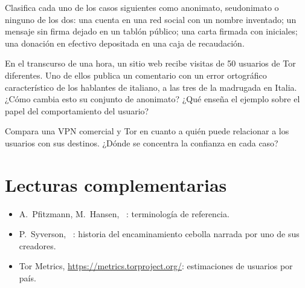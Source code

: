 \begin{esercizio}[1]\label{es:01-termini}
Clasifica cada uno de los casos siguientes como anonimato, seudonimato o ninguno de los dos: una cuenta en una red social con un nombre inventado; un mensaje sin firma dejado en un tablón público; una carta firmada con iniciales; una donación en efectivo depositada en una caja de recaudación.
\end{esercizio}

\begin{esercizio}[2]\label{es:01-insieme}
En el transcurso de una hora, un sitio web recibe visitas de 50 usuarios de Tor diferentes. Uno de ellos publica un comentario con un error ortográfico característico de los hablantes de italiano, a las tres de la madrugada en Italia. ¿Cómo cambia esto su conjunto de anonimato? ¿Qué enseña el ejemplo sobre el papel del comportamiento del usuario?
\end{esercizio}

\begin{esercizio}[2]\label{es:01-vpn}
Compara una VPN comercial y Tor en cuanto a quién puede relacionar a los usuarios con sus destinos. ¿Dónde se concentra la confianza en cada caso?
\end{esercizio}

\section*{Lecturas complementarias}
\begin{itemize}
  \item A.~Pfitzmann, M.~Hansen, ~\cite{pfitzmann2010terminology}: terminología de referencia.
  \item P.~Syverson, ~\cite{syverson2011peel}: historia del encaminamiento cebolla narrada por uno de sus creadores.
  \item Tor Metrics, \url{https://metrics.torproject.org/}: estimaciones de usuarios por país.
\end{itemize}
